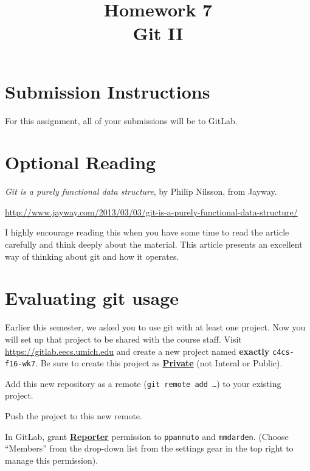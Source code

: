 \documentclass{article}
\begin{document}
\fancyhead[C]{}
\fancyhead[L]{}
\fancyhead[R]{}

\fancyfoot[C]{\color{gray} \thepage~/~\pageref*{LastPage}}
\pagestyle{fancyplain}


\title{\textbf{Homework 7\\Git II}}
\author{\textbf{\color{red}{Due: Saturday, October 29, 10:00PM (Hard Deadline)}}}
\date{}
\maketitle


\section*{Submission Instructions}
For this assignment, all of your submissions will be to GitLab.

\section*{Optional Reading}

\emph{Git is a purely functional data structure}, by Philip Nilsson, from Jayway.

\url{http://www.jayway.com/2013/03/03/git-is-a-purely-functional-data-structure/}

I highly encourage reading this when you have some time to read the article
carefully and think deeply about the material.
This article presents an excellent way of thinking about git and how it
operates.



\section{Evaluating git usage}

Earlier this semester, we asked you to use git with at least one project. Now
you will set up that project to be shared with the course staff. Visit
\url{https://gitlab.eecs.umich.edu} and create a new project named
\textbf{exactly} \texttt{c4cs-f16-wk7}.
Be sure to create this project as
\textbf{\ul{Private}} (not Interal or Public).

Add this new repository as a remote (\texttt{git remote add \dots}) to your
existing project.

Push the project to this new remote.

In GitLab, grant \textbf{\ul{Reporter}} permission to \texttt{ppannuto} and
\texttt{mmdarden}.
(Choose ``Members'' from the drop-down list from the settings gear in the top
right to manage this permission).
\end{document}
